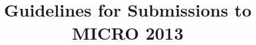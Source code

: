 \documentclass[pageno]{jpaper}
\begin{document}
\title{Guidelines for Submissions to MICRO 2013}

\date{}
\maketitle

\thispagestyle{empty}

\begin{abstract}

\end{abstract}










\end{document}
